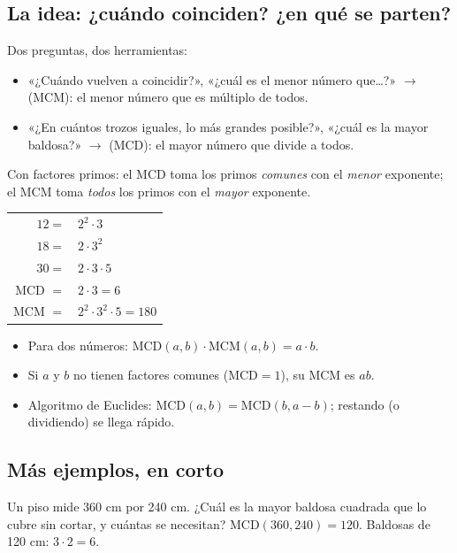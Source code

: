 \bitacora


\subsection{La idea: ¿cuándo coinciden? ¿en qué se parten?}
Dos preguntas, dos herramientas:
\begin{itemize}
  \item «¿Cuándo vuelven a coincidir?», «¿cuál es el menor número que…?» $\to$  (MCM): el
  menor número que es múltiplo de todos.
  \item «¿En cuántos trozos iguales, lo más grandes posible?», «¿cuál es la mayor baldosa?» $\to$  (MCD): el mayor número que divide a todos.
\end{itemize}

Con factores primos: el MCD toma los primos \emph{comunes} con el \emph{menor} exponente; el MCM toma \emph{todos} los
primos con el \emph{mayor} exponente.

\begin{center}
\begin{tabular}{rl}
$12 =$ & $2^2 \cdot 3$\\
$18 =$ & $2 \cdot 3^2$\\
$30 =$ & $2 \cdot 3 \cdot 5$\\\midrule
MCD $=$ & $2 \cdot 3 = 6$\\
MCM $=$ & $2^2 \cdot 3^2 \cdot 5 = 180$\\
\end{tabular}
\end{center}


\begin{regla}
\begin{itemize}
  \item Para dos números: $\text{MCD}(a, b) \cdot \text{MCM}(a, b) = a \cdot b$.
  \item Si $a$ y $b$ no tienen factores comunes ($\text{MCD} = 1$), su MCM es $ab$.
  \item Algoritmo de Euclides: $\text{MCD}(a, b) = \text{MCD}(b, a - b)$; restando (o dividiendo) se llega rápido.
\end{itemize}
\end{regla}

\subsection{Más ejemplos, en corto}
\begin{ejemplo}[Baldosas]
Un piso mide 360 cm por 240 cm. ¿Cuál es la mayor baldosa cuadrada que lo cubre sin cortar, y cuántas se necesitan?
\solucion $\text{MCD}(360, 240) = 120$. Baldosas de 120 cm: $3 \cdot 2 = 6$.
\end{ejemplo}

